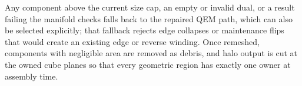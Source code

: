 Any component above the current size cap, an empty or invalid dual, or a result failing the manifold checks falls back to the repaired QEM path, which can also be selected explicitly; that fallback rejects edge collapses or maintenance flips that would create an existing edge or reverse winding. Once remeshed, components with negligible area are removed as debris, and halo output is cut at the owned cube planes so that every geometric region has exactly one owner at assembly time.
